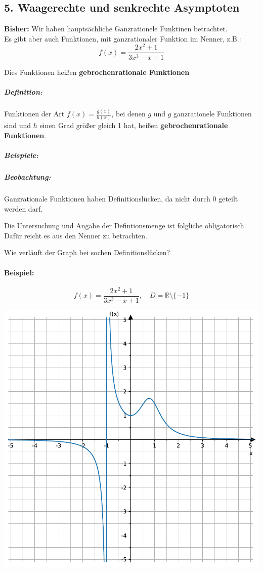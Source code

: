 \documentclass[
  letterpaper,
  DIV=11,
  numbers=noendperiod]{scrartcl}
\author{}
\date{2024-03-03}
\let\oldparagraph\paragraph
\renewcommand{\paragraph}[1]{\oldparagraph{#1}\mbox{}}
\let\oldsubparagraph\subparagraph
\renewcommand{\subparagraph}[1]{\oldsubparagraph{#1}\mbox{}}
\begin{document}
\subsection{5. Waagerechte und senkrechte
Asymptoten}\label{waagerechte-und-senkrechte-asymptoten}

\textbf{Bisher:} Wir haben hauptsächliche Ganzrationele Funktinen
betrachtet.\\
Es gibt aber auch Funktionen, mit ganzrationaler Funktion im Nenner,
z.B.: \[
f(x)=\frac{2x^2+1}{3x^3-x+1}
 \]

Dies Funktionen heißen \textbf{gebrochenrationale Funktionen}

\subparagraph{Definition:}\label{definition}

Funktionen der Art \(f(x)=\frac{g(x)}{h(x)}\), bei denen \(g\) und \(g\)
ganzrationele Funktionen sind und \(h\) einen Grad größer gleich 1 hat,
heißen \textbf{gebrochenrationale Funktionen}.

\subparagraph{Beispiele:}\label{beispiele}

\subparagraph{Beobachtung:}\label{beobachtung}

Ganzrationale Funktionen haben Definitionslücken, da nicht durch 0
geteilt werden darf.

Die Untersuchung und Angabe der Defintionsmenge ist folgliche
obligatorisch. Dafür reicht es aus den Nenner zu betrachten.

Wie verläuft der Graph bei sochen Definitionslücken?

\paragraph{Beispiel:}\label{beispiel}

\[
f(x)=\frac{2x^2+1}{3x^3-x+1}, \quad D=\mathbb{R} \setminus \{ -1\} 
 \]

\includegraphics{5_Asymptoten_files/figure-pdf/cell-2-output-1.pdf}
\end{document}
